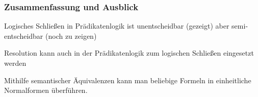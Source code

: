 \documentclass[aspectratio=1610,onlymath]{beamer}
\begin{document}
% 
% 
% 
% 

% 
% 






\begin{frame}\frametitle{Zusammenfassung und Ausblick}

Logisches Schließen in Prädikatenlogik ist unentscheidbar
(gezeigt)
aber semi-entscheidbar 
(noch zu zeigen)\bigskip

Resolution kann auch in der Prädikatenlogik zum logischen Schließen eingesetzt werden
\bigskip

Mithilfe semantischer Äquivalenzen kann man beliebige Formeln in einheitliche Normalformen überführen.\bigskip


\end{frame}
\end{document}

